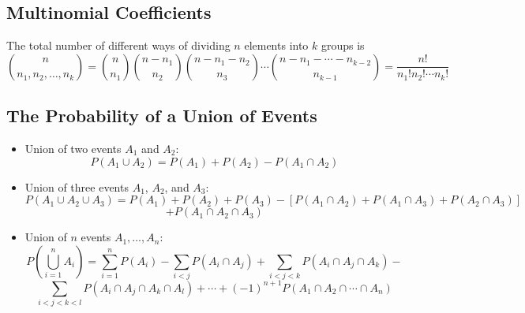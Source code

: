 \documentclass[11pt]{article}
\begin{document}
\subsection{Multinomial Coefficients}

The total number of different ways of dividing $n$ elements into $k$ groups is 
\[ {n \choose n_1, n_2, \ldots, n_k} = {n \choose n_1} {n - n_1 \choose n_2} {n - n_1 - n_2 
\choose n_3} \cdots {n - n_1 - \cdots - n_{k-2} \choose n_{k-1}} = \frac{n!}{n_1!n_2! \cdots 
n_k!}\]

\subsection{The Probability of a Union of Events}

\begin{itemize}
    \item Union of two events $A_1$ and $A_2$: \[P(A_1 \cup A_2) = P(A_1) + P(A_2) - P(A_1 \cap
    A_2)\]
    \item Union of three events $A_1$, $A_2$, and $A_3$: \[P(A_1 \cup A_2 \cup A_3) = P(A_1) + 
    P(A_2) + P(A_3) - \left[ P(A_1 \cap A_2) + P(A_1 \cap A_3) + P(A_2 \cap A_3) \right] \] \[ 
    + P(A_1 \cap A_2 \cap A_3)\]
    \item Union of $n$ events $A_1, \ldots, A_n$: \[ P \left(\bigcup_{i=1}^{n} A_i\right) = 
    \sum_{i=1}^{n} P(A_i) - \sum_{i<j}P(A_i \cap A_j) + \sum_{i<j<k}P(A_i \cap A_j \cap A_k) -
    \] \[ \sum_{i<j<k<l} P(A_i \cap A_j \cap A_k \cap A_l) + \cdots + {(-1)}^{n+1} P(A_1 \cap 
    A_2 \cap \cdots \cap A_n)\]
\end{itemize}
\end{document}
